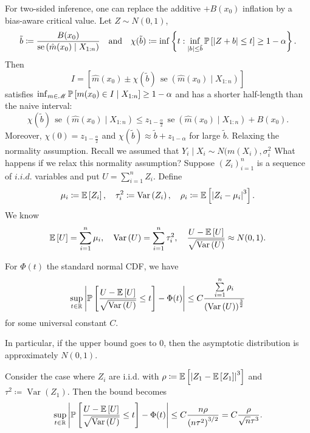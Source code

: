 For two-sided inference, one can replace the additive $+B(x_0)$ inflation by a bias-aware critical value. Let $Z \sim N(0,1)$,
\[
	\tilde{b} \coloneqq \frac{B(x_0)}{\operatorname{se}\left(\hat{m}(x_0) \mid X_{1:n}\right)}
	\quad\text{and}\quad
	\chi(\tilde{b}) \coloneqq \inf\left\{t: \inf_{|b|\le \tilde{b}} \P\left[\left|Z+b\right|\le t\right] \ge 1-\alpha\right\}
.\]
Then
\[
	I = \left[\hat{m}(x_0) \pm \chi(\tilde{b})\,\operatorname{se}\left(\hat{m}(x_0) \mid X_{1:n}\right)\right]
\]
satisfies $\inf_{m \in \mathscr{M}} \P\left[m(x_0) \in I \mid X_{1:n}\right] \ge 1-\alpha$ and has a shorter half-length than the naive interval:
\[
	\chi(\tilde{b})\,\operatorname{se}\left(\hat{m}(x_0) \mid X_{1:n}\right)
	\le z_{1-\frac{\alpha}{2}}\,\operatorname{se}\left(\hat{m}(x_0) \mid X_{1:n}\right) + B(x_0)
.\]
Moreover, $\chi(0)=z_{1-\frac{\alpha}{2}}$ and $\chi(\tilde{b})\approx \tilde{b}+z_{1-\alpha}$ for large $\tilde{b}$.
Relaxing the normality assumption. 
Recall we assumed that $Y_i \mid X_i \sim N(m(X_i), \sigma_i^2$
What happens if we relax this normality assumption? Suppose $(Z_i)_{i=1}^{n}$ is a sequence of $i.i.d.$ variables and put $U = \sum_{i=1}^{n} Z_i$.
Define
\[
	\mu_i \coloneqq \E\left[Z_i\right], \quad \tau_i^2 \coloneqq \operatorname{Var}\left(Z_i\right), \quad \rho_i \coloneqq \E\left[\left|Z_i-\mu_i\right|^3\right]
.\] 
We know \[
	\E\left[U\right]  = \sum\limits_{i=1}^{n} \mu_i, \quad \operatorname{Var}\left(U\right) = \sum\limits_{i=1}^{n} \tau_i^2, \quad \frac{U-\E\left[U\right] }{\sqrt{\operatorname{Var}\left(U\right)} } \approx N(0,1)
.\] 
\begin{theorem}
	For $\Phi(t)$ the standard normal CDF, we have \[
		\sup_{t\in \R} \left| \P\left[\frac{U-\E\left[U\right] }{\sqrt{\operatorname{Var}\left(U\right)} } \le t\right] - \Phi(t)\right| \le C \frac{\sum\limits_{i=1}^{n} \rho_i}{\left( \operatorname{Var}\left(U\right) \right)^{\frac{3}{2}}}
	\] for some universal constant $C$.

	In particular, if the upper bound goes to $0$, then the asymptotic distribution is approximately $N(0,1)$.
\end{theorem}
\begin{example}Consider the case where $Z_i$ are i.i.d. with $\rho\coloneqq\E\left[\left|Z_1-\E\left[Z_1\right]\right|^3\right]$ and $\tau^2 \coloneqq \operatorname{Var}\left(Z_1\right)$. Then the bound becomes
\[
	\sup_{t \in \R}\left|\P\left[\frac{U-\E\left[U\right]}{\sqrt{\operatorname{Var}\left(U\right)}}\le t\right]-\Phi(t)\right|
	\le C\frac{n\rho}{\left(n\tau^2\right)^{3/2}}
	= C\frac{\rho}{\sqrt{n}\tau^3}
.\]
\end{example}
